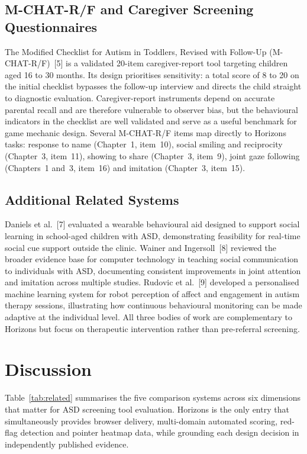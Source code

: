 \documentclass[12pt,a4paper,oneside]{report}
\begin{document}
	\subsection{M-CHAT-R/F and Caregiver Screening Questionnaires}
	
	The Modified Checklist for Autism in Toddlers, Revised with Follow-Up (M-CHAT-R/F)~[5] is a validated 20-item caregiver-report tool targeting children aged 16 to 30 months. Its design prioritises sensitivity: a total score of 8 to 20 on the initial checklist bypasses the follow-up interview and directs the child straight to diagnostic evaluation. Caregiver-report instruments depend on accurate parental recall and are therefore vulnerable to observer bias, but the behavioural indicators in the checklist are well validated and serve as a useful benchmark for game mechanic design. Several M-CHAT-R/F items map directly to Horizons tasks: response to name (Chapter~1, item~10), social smiling and reciprocity (Chapter~3, item~11), showing to share (Chapter~3, item~9), joint gaze following (Chapters~1 and~3, item~16) and imitation (Chapter~3, item~15).
	
	\subsection{Additional Related Systems}
	
	Daniels et al.~[7] evaluated a wearable behavioural aid designed to support social learning in school-aged children with ASD, demonstrating feasibility for real-time social cue support outside the clinic. Wainer and Ingersoll~[8] reviewed the broader evidence base for computer technology in teaching social communication to individuals with ASD, documenting consistent improvements in joint attention and imitation across multiple studies. Rudovic et al.~[9] developed a personalised machine learning system for robot perception of affect and engagement in autism therapy sessions, illustrating how continuous behavioural monitoring can be made adaptive at the individual level. All three bodies of work are complementary to Horizons but focus on therapeutic intervention rather than pre-referral screening.
	
	\section{Discussion}
	
	Table~\ref{tab:related} summarises the five comparison systems across six dimensions that matter for ASD screening tool evaluation. Horizons is the only entry that simultaneously provides browser delivery, multi-domain automated scoring, red-flag detection and pointer heatmap data, while grounding each design decision in independently published evidence.
	
\end{document}
